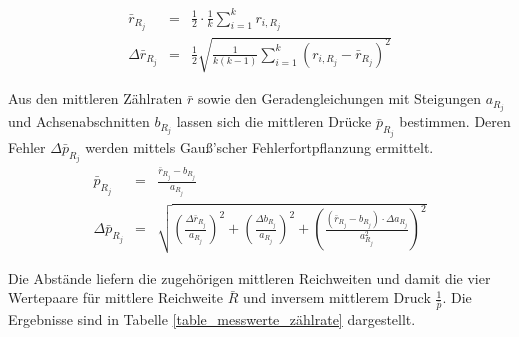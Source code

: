 \documentclass[12pt,a4paper]{scrartcl}
\numberwithin{equation}{section} %
\begin{document}
\begin{eqnarray}
	\bar{r}_{R_j} &=& \frac{1}{2} \cdot \frac{1}{k} \sum_{i=1}^{k} r_{i,R_j} \\
	\Delta \bar{r}_{R_j} &=& \frac{1}{2} \sqrt{\frac{1}{k (k-1)} \sum_{i=1}^{k} (r_{i,R_j} - \bar{r}_{R_j})^2}
\end{eqnarray}

\noindent
Aus den mittleren Zählraten $\bar r$ sowie den Geradengleichungen mit Steigungen $a_{R_j}$ und Achsenabschnitten $b_{R_j}$ lassen sich die mittleren Drücke $\bar{p}_{R_j}$ bestimmen. Deren Fehler $\Delta \bar p_{R_j}$ werden mittels Gauß'scher Fehlerfortpflanzung ermittelt.
\begin{eqnarray}
	\bar{p}_{R_j} &=& \frac{\bar{r}_{R_j} - b_{R_j}}{a_{R_j}} \\
	\Delta \bar{p}_{R_j} &=& \sqrt{\left(\frac{\Delta \bar{r}_{R_j}}{a_{R_j}}\right)^2 + \left(\frac{\Delta b_{R_j}}{a_{R_j}}\right)^2 + \left(\frac{(\bar{r}_{R_j} - b_{R_j}) \cdot \Delta a_{R_j}}{a_{R_j}^2}\right)^2}
\end{eqnarray}

\noindent
Die Abstände liefern die zugehörigen mittleren Reichweiten und damit die vier Wertepaare für mittlere Reichweite $\bar{R}$ und inversem mittlerem Druck $\frac{1}{\bar{p}}$. Die Ergebnisse sind in Tabelle \ref{table_messwerte_zählrate} dargestellt.
\end{document}
